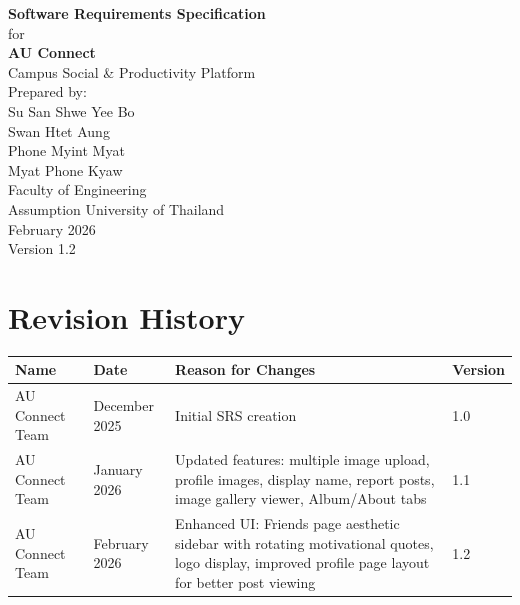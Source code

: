\documentclass[12pt,a4paper]{article}
\begin{document}
\begin{titlepage}
\begin{flushright}
\vspace*{1.3cm}

{\fontsize{35}{39}\selectfont \textbf{Software Requirements Specification}}\\[0.7cm]

{\large for}\\[0.5cm]
{\Large \textbf{AU Connect}}\\[1.5cm]

{\large Campus Social \& Productivity Platform}\\[1cm]

Prepared by:\\[0.3cm]
Su San Shwe Yee Bo\\
Swan Htet Aung\\
Phone Myint Myat\\
Myat Phone Kyaw\\[1cm]

Faculty of Engineering\\
Assumption University of Thailand\\[1cm]

February 2026\\[2cm]

{\small Version 1.2}

\end{flushright}
\vfill
\end{titlepage}

\tableofcontents
\newpage

\section*{Revision History}

\begin{longtable}{|p{3cm}|p{3cm}|p{6cm}|p{2cm}|}
\hline
\textbf{Name} & \textbf{Date} & \textbf{Reason for Changes} & \textbf{Version} \\
\hline
AU Connect Team & December 2025 & Initial SRS creation & 1.0 \\
\hline
AU Connect Team & January 2026 & Updated features: multiple image upload, profile images, display name, report posts, image gallery viewer, Album/About tabs & 1.1 \\
\hline
AU Connect Team & February 2026 & Enhanced UI: Friends page aesthetic sidebar with rotating motivational quotes, logo display, improved profile page layout for better post viewing & 1.2 \\
\hline
\end{longtable}
\end{document}
